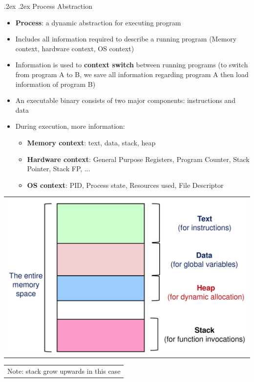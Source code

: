 \documentclass[13pt,landscape,a4paper]{article}
\makeatletter
\renewcommand{\subsection}{\@startsection{subsection}{1}{0mm}%
    {.2ex}%
    {.2ex}%
    {\sffamily\bfseries}}
\makeatother
\begin{document}
\begin{multicols*}{3}
        \subsection{Process Abstraction}
        \begin{itemize}
            \item \textbf{Process}: a dynamic abstraction for executing program
            \item Includes all information required to describe a running program (Memory context, hardware context, OS context)
            \item Information is used to \textbf{context switch} between running programs (to switch from program A to B, we save all information regarding program A then load information of program B)
            \item An executable binary consists of two major components: instructions and data
            \item During execution, more information:
            \begin{itemize}
                \item \textbf{Memory context}: text, data, stack, heap
                \item \textbf{Hardware context}: General Purpose Registers, Program Counter, Stack Pointer, Stack FP, ...
                \item \textbf{OS context}: PID, Process state, Resources used, File Descriptor
            \end{itemize}
        \end{itemize}
        \begin{tabular}{l}
            \includegraphics[width=0.5\linewidth]{stack-memory}
        \end{tabular}
        \begin{tabularx}{0.45\columnwidth}{X}
            Note: stack grow upwards in this case
        \end{tabularx}

\end{multicols*}
\end{document}
